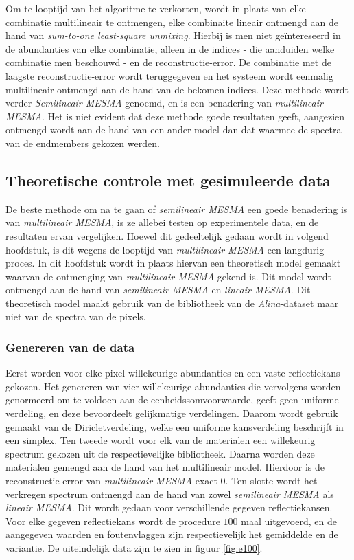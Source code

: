\documentclass[12pt]{report}
\begin{document}
Om te looptijd van het algoritme te verkorten, wordt in plaats van elke combinatie multilineair te ontmengen, elke combinaite lineair ontmengd aan de hand van \textit{sum-to-one least-square unmixing}. Hierbij is men niet ge\"intereseerd in de abundanties van elke combinatie, alleen in de indices - die aanduiden welke combinatie men beschouwd - en de reconstructie-error. De combinatie met de laagste reconstructie-error wordt teruggegeven en het systeem wordt eenmalig multilineair ontmengd aan de hand van de bekomen indices. Deze methode wordt verder \textit{Semilineair MESMA} genoemd, en is een benadering van \textit{multilineair MESMA}. Het is niet evident dat deze methode goede resultaten geeft, aangezien ontmengd wordt aan de hand van een ander model dan dat waarmee de spectra van de endmembers gekozen werden.

\subsection{Theoretische controle met gesimuleerde data} \label{sec:tc}

De beste methode om na te gaan of \textit{semilineair MESMA} een goede benadering is van \textit{multilineair MESMA}, is ze allebei testen op experimentele data, en de resultaten ervan vergelijken. Hoewel dit gedeeltelijk gedaan wordt in volgend hoofdstuk, is dit wegens de looptijd van \textit{multilineair MESMA} een langdurig proces. In dit hoofdstuk wordt in plaats hiervan een theoretisch model gemaakt waarvan de ontmenging van \textit{multilineair MESMA} gekend is. Dit model wordt ontmengd aan de hand van \textit{semilineair MESMA} en \textit{lineair MESMA}. Dit theoretisch model maakt gebruik van de bibliotheek van de \textit{Alina}-dataset maar niet van de spectra van de pixels.

\subsubsection{Genereren van de data}

Eerst worden voor elke pixel willekeurige abundanties en een vaste reflectiekans gekozen. Het genereren van vier willekeurige abundanties die vervolgens worden genormeerd om te voldoen aan de eenheidssomvoorwaarde, geeft geen uniforme verdeling, en deze bevoordeelt gelijkmatige verdelingen. Daarom wordt gebruik gemaakt van de Diricletverdeling, welke een uniforme kansverdeling beschrijft in een simplex. Ten tweede wordt voor elk van de materialen een willekeurig spectrum gekozen uit de respectievelijke bibliotheek. Daarna worden deze materialen gemengd aan de hand van het multilineair model. Hierdoor is de reconstructie-error van \textit{multilineair MESMA} exact 0. Ten slotte wordt het verkregen spectrum ontmengd aan de hand van zowel \textit{semilineair MESMA} als \textit{lineair MESMA}. Dit wordt gedaan voor verschillende gegeven reflectiekansen. Voor elke gegeven reflectiekans wordt de procedure $100$ maal uitgevoerd, en de aangegeven waarden en foutenvlaggen zijn respectievelijk het gemiddelde en de variantie. De uiteindelijk data zijn te zien in figuur \ref{fig:e100}.
\end{document}
